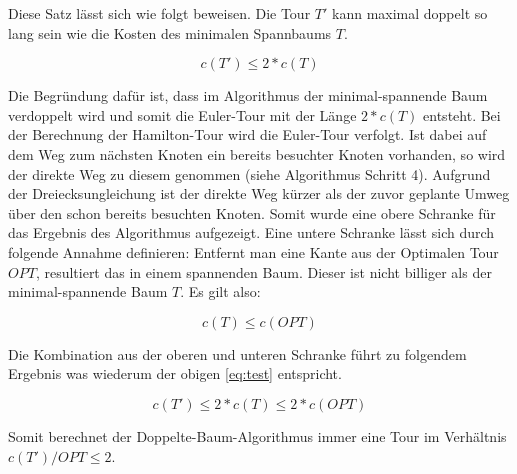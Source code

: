 \documentclass{article}
\begin{document}
Diese Satz lässt sich wie folgt beweisen. Die Tour $T'$ kann maximal doppelt so lang sein wie die Kosten des minimalen Spannbaums $T$.

\begin{equation}
c(T') \leq 2 * c(T)
\end{equation}

Die Begründung dafür ist, dass im Algorithmus der minimal-spannende Baum verdoppelt wird und somit die Euler-Tour mit der Länge $2 * c(T)$ entsteht. Bei der Berechnung der Hamilton-Tour wird die Euler-Tour verfolgt. Ist dabei auf dem Weg zum nächsten Knoten ein bereits besuchter Knoten vorhanden, so wird der direkte Weg zu diesem genommen (siehe Algorithmus Schritt 4). Aufgrund der Dreiecksungleichung ist der direkte Weg kürzer als der zuvor geplante Umweg über den schon bereits besuchten Knoten. Somit wurde eine obere Schranke für das Ergebnis des Algorithmus aufgezeigt. Eine untere Schranke lässt sich durch folgende Annahme definieren: Entfernt man eine Kante aus der Optimalen Tour $OPT$, resultiert das in einem spannenden Baum. Dieser ist nicht billiger als der minimal-spannende Baum $T$. Es gilt also:

\begin{equation}
c(T) \leq c(OPT)
\end{equation}

Die Kombination aus der oberen und unteren Schranke führt zu folgendem Ergebnis was wiederum der obigen \autoref{eq:test} entspricht.

\begin{equation}
c(T') \leq 2 * c(T) \leq 2 * c(OPT)
\end{equation}

Somit berechnet der Doppelte-Baum-Algorithmus immer eine Tour im Verhältnis $c(T')/OPT \leq 2$.


%
%
%
\nocite{busing2010graphen}
\nocite{jungnickel1994graphen}
\printbibliography[heading=bibnumbered,title={Literaturverzeichnis}]
\end{document}
